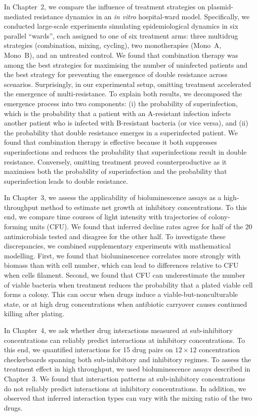 \documentclass[../main.tex]{subfiles}
\begin{document}
In Chapter~2, we compare the influence of treatment strategies on plasmid-mediated resistance dynamics in an \textit{in vitro} hospital-ward model.
Specifically, we conducted large-scale experiments simulating epidemiological dynamics in six parallel ``wards'', each assigned to one of six treatment arms: three multidrug strategies (combination, mixing, cycling), two monotherapies (Mono~A, Mono~B), and an untreated control.
We found that combination therapy was among the best strategies for maximising the number of uninfected patients and the best strategy for preventing the emergence of double resistance across scenarios.
Surprisingly,  in our experimental setup,  omitting treatment accelerated the emergence of multi-resistance.
To explain both results, we decomposed the emergence process into two components:
(i) the probability of superinfection, which is the probability that a patient with an A-resistant infection infects another patient who is infected with B-resistant bacteria (or vice versa), and
(ii) the probability that double resistance emerges in a superinfected patient.
We found that combination therapy is effective because it both suppresses superinfections and reduces the probability that superinfections result in double resistance.
Conversely, omitting treatment proved counterproductive as it maximises both the probability of superinfection and the probability that superinfection leads to double resistance.

In Chapter~3, we assess the applicability of bioluminescence assays as a high-throughput method to estimate net growth at inhibitory concentrations.
To this end, we compare time courses of light intensity with trajectories of colony-forming units (CFU).
We found that inferred decline rates agree for half of the 20 antimicrobials tested and disagree for the other half.
To investigate these discrepancies, we combined supplementary experiments with mathematical modelling.
First, we found that bioluminescence correlates more strongly with biomass than with cell number, which can lead to differences relative to CFU when cells filament.
Second, we found that CFU can underestimate the number of viable bacteria when treatment reduces the probability that a plated viable cell forms a colony.
This can occur when drugs induce a viable-but-nonculturable state, or at high drug concentrations when antibiotic carryover causes continued killing after plating.

In Chapter~4, we ask whether drug interactions measured at sub-inhibitory concentrations can reliably predict interactions at inhibitory concentrations.
To this end, we quantified interactions for 15 drug pairs on \(12\times 12\) concentration checkerboards spanning both sub-inhibitory and inhibitory regimes.
To assess the treatment effect in high throughput, we used bioluminescence assays described in Chapter~3.
We found that interaction patterns at sub-inhibitory concentrations do not reliably predict interactions at inhibitory concentrations.
In addition, we observed that inferred interaction types can vary with the mixing ratio of the two drugs.
\end{document}
